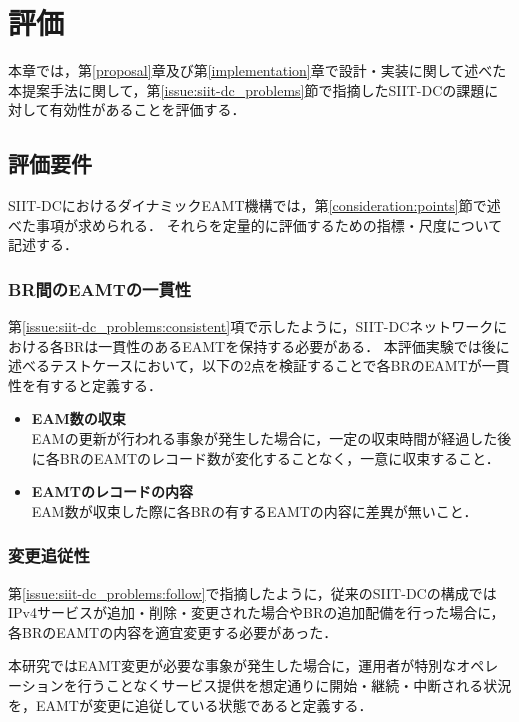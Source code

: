 \chapter{評価}
\label{evaluation}
本章では，第\ref{proposal}章及び第\ref{implementation}章で設計・実装に関して述べた本提案手法に関して，第\ref{issue:siit-dc_problems}節で指摘したSIIT-DCの課題に対して有効性があることを評価する．



\section{評価要件}
\label{evaluation:requirements}
SIIT-DCにおけるダイナミックEAMT機構では，第\ref{consideration:points}節で述べた事項が求められる．
それらを定量的に評価するための指標・尺度について記述する．


\subsection{BR間のEAMTの一貫性}
\label{evaluation:requirements:consistency}

第\ref{issue:siit-dc_problems:consistent}項で示したように，SIIT-DCネットワークにおける各BRは一貫性のあるEAMTを保持する必要がある．
本評価実験では後に述べるテストケースにおいて，以下の2点を検証することで各BRのEAMTが一貫性を有すると定義する．
\begin{itemize}
    \item \textbf{EAM数の収束} \\
    EAMの更新が行われる事象が発生した場合に，一定の収束時間が経過した後に各BRのEAMTのレコード数が変化することなく，一意に収束すること．
    \item \textbf{EAMTのレコードの内容} \\
    EAM数が収束した際に各BRの有するEAMTの内容に差異が無いこと．
\end{itemize}

\subsection{変更追従性}
\label{evaluation:requirements:change}
第\ref{issue:siit-dc_problems:follow}で指摘したように，従来のSIIT-DCの構成ではIPv4サービスが追加・削除・変更された場合やBRの追加配備を行った場合に，各BRのEAMTの内容を適宜変更する必要があった．

本研究ではEAMT変更が必要な事象が発生した場合に，運用者が特別なオペレーションを行うことなくサービス提供を想定通りに開始・継続・中断される状況を，EAMTが変更に追従している状態であると定義する．

